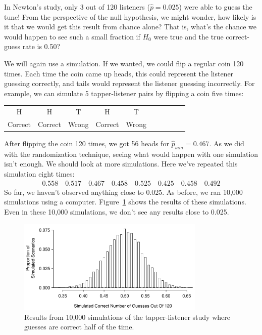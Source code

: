 In Newton's study, only 3 out of 120 listeners ($\hat{p} = 0.025$) were able to guess the tune! From the perspective of the null hypothesis, we might wonder, how likely is it that we would get this result from chance alone? That is, what's the chance we would happen to see such a small fraction if $H_0$ were true and the true correct-guess rate is 0.50?

We will again use a simulation. If we wanted, we could flip a regular coin 120 times. Each time the coin came up heads, this could represent the listener guessing correctly, and tails would represent the listener guessing incorrectly. For example, we can simulate 5 tapper-listener pairs by flipping a coin five times:
\begin{center}
\begin{tabular}{ccc ccc ccc c}
H & H & T & H & T \\
Correct & Correct & Wrong & Correct & Wrong \\
\end{tabular}
\end{center}
After flipping the coin 120 times, we got 56 heads for $\hat{p}_{sim} = 0.467$. As we did with the randomization technique, seeing what would happen with one simulation isn't enough. We should look at more simulations. Here we've repeated this simulation eight times:
\begin{align*}
0.558 \quad 0.517 \quad 0.467 \quad 0.458 \quad
0.525 \quad 0.425 \quad 0.458 \quad 0.492
\end{align*} %
So far, we haven't observed anything close to 0.025. As before, we ran 10,000 simulations using a computer. Figure~\ref{TappersAndListenersNullDistribution} shows the results of these simulations. Even in these 10,000 simulations, we don't see any results close to 0.025.

\begin{figure}[ht]
\centering
\includegraphics[width=0.8\textwidth]{02/figures/TappersAndListeners/TappersAndListenersNullDistribution}
\caption{Results from 10,000 simulations of the tapper-listener study where guesses are correct half of the time.}
\label{TappersAndListenersNullDistribution}
\end{figure}

